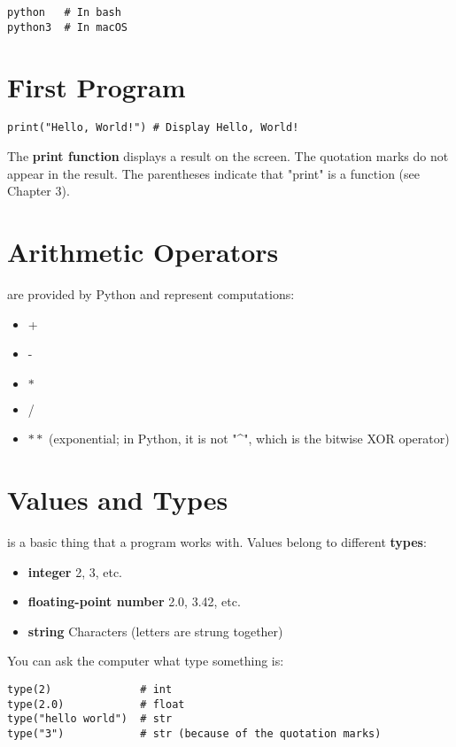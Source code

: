 \documentclass{report}
\begin{document}
\begin{verbatim}
python   # In bash
python3  # In macOS
\end{verbatim}

\section{First Program}

\begin{verbatim}
print("Hello, World!") # Display Hello, World!
\end{verbatim}

The \textbf{print function} displays a result on the screen. The quotation marks do not appear in the result. The parentheses indicate that "print" is a function (see Chapter 3).

\section{Arithmetic Operators}

 are provided by Python and represent computations:

\begin{itemize}
\item +
\item -
\item $\ast$
\item /
\item $\ast\ast$ (exponential; in Python, it is not "\textasciicircum", which is the bitwise XOR operator)
\end{itemize}

\section{Values and Types}

 is a basic thing that a program works with. Values belong to different \textbf{types}:

\begin{itemize}
\item \textbf{integer} 2, 3, etc.
\item \textbf{floating-point number} 2.0, 3.42, etc.
\item \textbf{string} Characters (letters are strung together)
\end{itemize}

You can ask the computer what type something is:

\begin{verbatim}
type(2)              # int
type(2.0)            # float
type("hello world")  # str
type("3")            # str (because of the quotation marks)
\end{verbatim}
\end{document}
